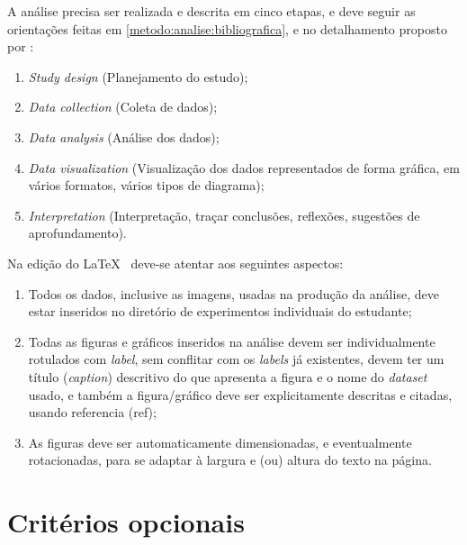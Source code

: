 A análise precisa ser realizada e descrita em cinco etapas, e deve seguir as orientações feitas em \ref{metodo:analise:bibliografica}, e no detalhamento proposto por \citet{aria_bibliometrix_2017}:
\begin{enumerate}
    \item \textit{Study design} (Planejamento do estudo);

    \item  \textit{Data collection} (Coleta de dados);

    \item \textit{Data analysis} (Análise dos dados);

    \item \textit{Data visualization} (Visualização dos dados representados de forma gráfica, em vários formatos, vários tipos de diagrama);

    \item  \textit{Interpretation} (Interpretação, traçar conclusões, reflexões, sugestões de aprofundamento).
\end{enumerate}

Na edição do \LaTeX~ deve-se atentar aos seguintes aspectos:
\begin{enumerate}
    \item Todos os dados, inclusive as imagens, usadas na produção da análise, deve estar inseridos no diretório de experimentos individuais do estudante;
    \item Todas as figuras e gráficos inseridos na análise devem ser individualmente rotulados com \textit{label}, sem conflitar com os \textit{labels} já existentes, devem ter um título (\textit{caption}) descritivo do que apresenta a figura e o nome do \textit{dataset} usado, e também a figura/gráfico deve ser explicitamente descritas e citadas, usando referencia (ref);
    \item As figuras deve ser automaticamente dimensionadas, e eventualmente rotacionadas,  para se adaptar à largura e (ou) altura do texto na página. 
\end{enumerate}

\section{Critérios opcionais}

